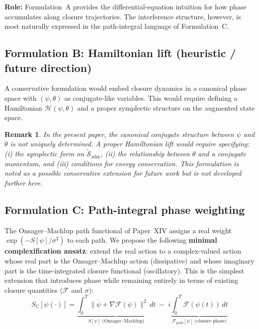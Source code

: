 \documentclass[12pt]{article}
\newtheorem{remark}[theorem]{Remark}
\newcommand{\Fcal}{\mathcal{F}}
\newcommand{\Hcal}{\mathcal{H}}
\begin{document}
\textbf{Role:} Formulation~A provides the differential-equation intuition for how phase accumulates along closure trajectories. The interference structure, however, is most naturally expressed in the path-integral language of Formulation~C.

\subsection{Formulation B: Hamiltonian lift (heuristic / future direction)}

A conservative formulation would embed closure dynamics in a canonical phase space with $(\psi, \theta)$ as conjugate-like variables. This would require defining a Hamiltonian $\Hcal(\psi, \theta)$ and a proper symplectic structure on the augmented state space.

\begin{remark}
In the present paper, the canonical conjugate structure between $\psi$ and $\theta$ is not uniquely determined. A proper Hamiltonian lift would require specifying: (i) the symplectic form on $\tilde{\mathcal{S}}_{\mathrm{adm}}$, (ii) the relationship between $\theta$ and a conjugate momentum, and (iii) conditions for energy conservation. This formulation is noted as a possible conservative extension for future work but is not developed further here.
\end{remark}

\subsection{Formulation C: Path-integral phase weighting}\label{sec:formC}

The Onsager--Machlup path functional of Paper~XIV assigns a real weight $\exp(-S[\psi]/\sigma^2)$ to each path. We propose the following \textbf{minimal complexification ansatz}: extend the real action to a complex-valued action whose real part is the Onsager--Machlup action (dissipative) and whose imaginary part is the time-integrated closure functional (oscillatory). This is the simplest extension that introduces phase while remaining entirely in terms of existing closure quantities ($\Fcal$ and $\sigma$):
\begin{equation}\label{eq:complexaction}
    S_{\mathbb{C}}[\psi(\cdot)] = \underbrace{\int_0^T \|\dot{\psi} + \nabla\Fcal(\psi)\|^2\, dt}_{S[\psi]\;\text{(Onsager--Machlup)}} \;-\; i\underbrace{\int_0^T \Fcal(\psi(t))\, dt}_{\Fcal_{\mathrm{path}}[\psi]\;\text{(closure phase)}}
\end{equation}
\end{document}
